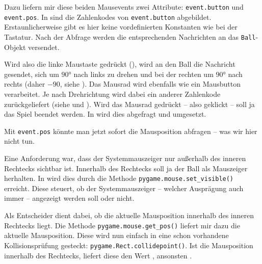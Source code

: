 Dazu liefern mir diese beiden Mausevents zwei Attribute: \texttt{event.button} und \texttt{event.pos}. In  sind die Zahlenkodes von \texttt{event.button} abgebildet. Erstaunlicherweise gibt es hier keine vordefinierten Konstanten wie bei der Tastatur. Nach der Abfrage werden die entsprechenden Nachrichten an das \texttt{Ball}-Objekt versendet.

Wird also die linke Maustaste gedrückt (), wird an den Ball die Nachricht gesendet, sich um $90°$ nach links zu drehen und bei der rechten um $90°$ nach rechts (daher $-90$, siehe ). Das Mausrad wird ebenfalls wie ein Mausbutton verarbeitet. Je nach Drehrichtung wird dabei ein anderer Zahlenkode zurückgeliefert (siehe  und ). Wird das Mausrad gedrückt -- also geklickt -- soll ja das Spiel beendet werden. In  wird dies abgefragt und umgesetzt.

Mit \texttt{event.pos} könnte man jetzt sofort die Mausposition abfragen -- was wir hier nicht tun.

\newpage
{} 

Eine Anforderung war, dass der Systemmauszeiger nur außerhalb des inneren Rechtecks sichtbar ist. Innerhalb des Rechtecks soll ja der Ball als Mauszeiger herhalten. In  wird dies durch die Methode \texttt{\texttt{pygame.mouse.set\_visible()}} erreicht. Diese steuert, ob der Systemmauszeiger -- welcher Ausprägung auch immer -- angezeigt werden soll oder nicht. 

Als Entscheider dient dabei, ob die aktuelle Mausposition innerhalb des inneren Rechtecks liegt. Die Methode \texttt{pygame.mouse.get\_pos()} liefert mir dazu die aktuelle Mausposition. Diese wird nun einfach in eine schon vorhandene Kollisionsprüfung gesteckt: \texttt{pygame.Rect.collidepoint()}. Ist die Mausposition innerhalb des Rechtecks, liefert diese den Wert \true, ansonsten \false.%

